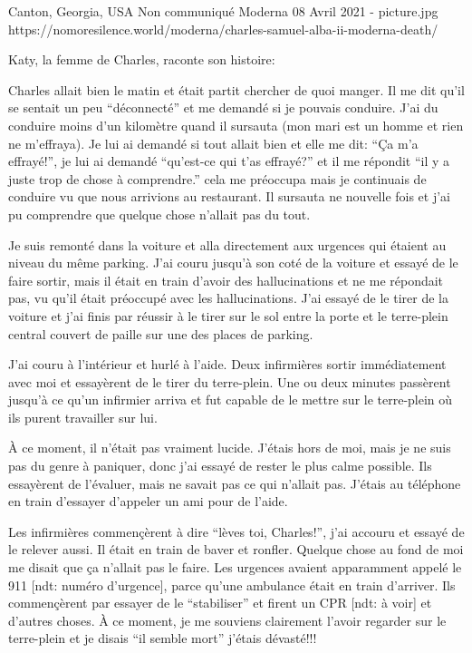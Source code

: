 {Canton, Georgia, USA}
{Non communiqué}
{Moderna}
{08 Avril 2021}
{-}
{picture.jpg}
{https://nomoresilence.world/moderna/charles-samuel-alba-ii-moderna-death/}
{

\normalsize

Katy, la femme de Charles, raconte son histoire:

Charles allait bien le matin et était partit chercher de quoi manger. Il me dit qu'il se sentait un peu “déconnecté” et me demandé si je pouvais conduire. J'ai du conduire moins d'un kilomètre quand il sursauta (mon mari est un homme et rien ne m'effraya). Je lui ai demandé si tout allait bien et elle me dit: “Ça m'a effrayé!”, je lui ai demandé “qu'est-ce qui t'as effrayé?” et il me répondit “il y a juste trop de chose à comprendre.” cela me préoccupa mais je continuais de conduire vu que nous arrivions au restaurant. Il sursauta ne nouvelle fois et j'ai pu comprendre que quelque chose n'allait pas du tout.

Je suis remonté dans la voiture et alla directement aux urgences qui étaient au niveau du même parking. J'ai couru jusqu'à son coté de la voiture et essayé de le faire sortir, mais il était en train d'avoir des hallucinations et ne me répondait pas, vu qu'il était préoccupé avec les hallucinations. J'ai essayé de le tirer de la voiture et j'ai finis par réussir à le tirer sur le sol entre la porte et le terre-plein central couvert de paille sur une des places de parking.

J'ai couru à l'intérieur et hurlé à l'aide. Deux infirmières sortir immédiatement avec moi et essayèrent de le tirer du terre-plein. Une ou deux minutes passèrent jusqu'à ce qu'un infirmier arriva et fut capable de le mettre sur le terre-plein où ils purent travailler sur lui.

À ce moment, il n'était pas vraiment lucide. J'étais hors de moi, mais je ne suis pas du genre à paniquer, donc j'ai essayé de rester le plus calme possible. Ils essayèrent de l'évaluer, mais ne savait pas ce qui n'allait pas. J'étais au téléphone en train d'essayer d'appeler un ami pour de l'aide.

Les infirmières commençèrent à dire “lèves toi, Charles!”, j'ai accouru et essayé de le relever aussi. Il était en train de baver et ronfler. Quelque chose au fond de moi me disait que ça n'allait pas le faire. Les urgences avaient apparamment appelé le 911 [ndt: numéro d'urgence], parce qu'une ambulance était en train d'arriver. Ils commençèrent par essayer de le “stabiliser” et firent un CPR [ndt: à voir] et d'autres choses. À ce moment, je me souviens clairement l'avoir regarder sur le terre-plein et je disais “il semble mort” j'étais dévasté!!!

}

